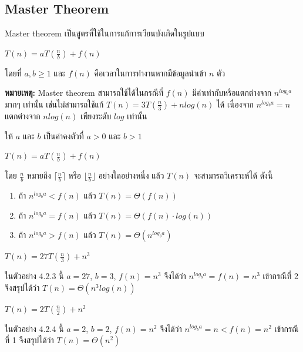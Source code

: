 \newpage

\subsection{Master Theorem}

Master theorem เป็นสูตรที่ใช้ในการแก้การเวียนบังเกิดในรูปแบบ
\begin{center}
$T(n)=aT(\frac{n}{b})+f(n)$
\end{center}
โดยที่ $a,b \geq 1$ และ $f(n)$ คือเวลาในการทำงานหากมีข้อมูลนำเข้า $n$ ตัว

\textbf{หมายเหตุ:} Master theorem สามารถใช้ได้ในกรณีที่ $f(n)$ มีค่าเท่ากับหรือแตกต่างจาก $n^{log_b a}$ มากๆ เท่านั้น เช่นไม่สามารถใช้แก้ $T(n)=3T(\frac{n}{3}) + nlog(n)$ ได้ เนื่องจาก $n^{log_b a}=n$ แตกต่างจาก $nlog(n)$ เพียงระดับ $log$ เท่านั้น

\begin{theorem}
ให้ $a$ และ $b$ เป็นค่าคงตัวที่ $a>0$ และ $b>1$
\begin{center}
$T(n)=aT(\frac{n}{b})+f(n)$
\end{center}
โดย $\frac{n}{b}$ หมายถึง $\lceil\frac{n}{b}\rceil$ หรือ $\lfloor \frac{n}{b} \rfloor$ อย่างใดอย่างหนึ่ง แล้ว $T(n)$ จะสามารถวิเคราะห์ได้ ดังนี้
\begin{enumerate}
\item ถ้า $n^{log_b a}<f(n)$ แล้ว $T(n)=\Theta(f(n))$
\item ถ้า $n^{log_b a}=f(n)$ แล้ว $T(n)=\Theta(f(n) \cdot log(n))$
\item ถ้า $n^{log_b a}>f(n)$ แล้ว $T(n)=\Theta(n^{log_b a})$
\end{enumerate}
\end{theorem}

\begin{example}
$T(n)=27T(\frac{n}{3}) + n^3$

ในตัวอย่าง 4.2.3 นี้ $a=27$, $b=3$, $f(n)=n^3$ จึงได้ว่า $n^{log_b a}=f(n)=n^3$ เข้ากรณีที่ 2 จึงสรุปได้ว่า $T(n)=\Theta(n^3 log(n))$
\end{example}

\begin{example}
$T(n)=2T(\frac{n}{2}) + n^2$

ในตัวอย่าง 4.2.4 นี้ $a=2$, $b=2$, $f(n)=n^2$ จึงได้ว่า $n^{log_b a}=n<f(n)=n^2$ เข้ากรณีที่ 1 จึงสรุปได้ว่า $T(n)=\Theta(n^2)$
\end{example}
